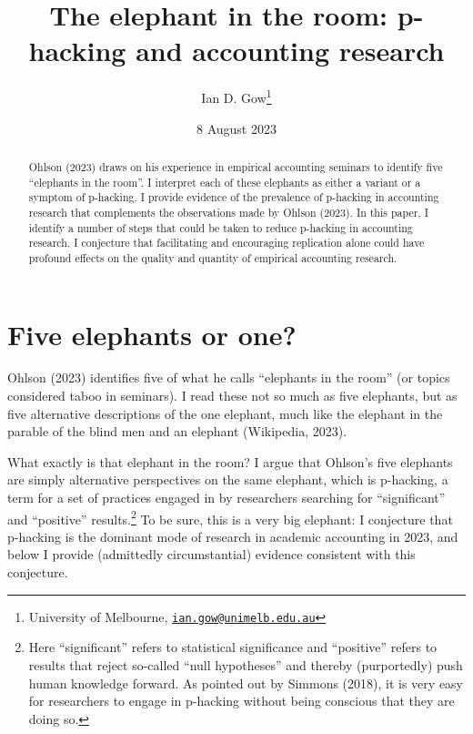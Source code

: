 \documentclass[
  letterpaper,
  DIV=11,
  numbers=noendperiod]{scrartcl}
\title{The elephant in the room: p-hacking and accounting research}
\author{Ian D. Gow\footnote{University of Melbourne,
  \href{mailto:ian.gow@unimelb.edu.au}{\nolinkurl{ian.gow@unimelb.edu.au}}}}
\date{8 August 2023}
\begin{document}
\maketitle
\begin{abstract}
Ohlson (2023) draws on his experience in empirical accounting seminars
to identify five ``elephants in the room''. I interpret each of these
elephants as either a variant or a symptom of p-hacking. I provide
evidence of the prevalence of p-hacking in accounting research that
complements the observations made by Ohlson (2023). In this paper, I
identify a number of steps that could be taken to reduce p-hacking in
accounting research. I conjecture that facilitating and encouraging
replication alone could have profound effects on the quality and
quantity of empirical accounting research.
\end{abstract}
\ifdefined\Shaded\renewenvironment{Shaded}{\begin{tcolorbox}[borderline west={3pt}{0pt}{shadecolor}, sharp corners, frame hidden, enhanced, breakable, interior hidden, boxrule=0pt]}{\end{tcolorbox}}\fi

\hypertarget{five-elephants-or-one}{%
\section{Five elephants or one?}\label{five-elephants-or-one}}

Ohlson (2023) identifies five of what he calls ``elephants in the room''
(or topics considered taboo in seminars). I read these not so much as
five elephants, but as five alternative descriptions of the one
elephant, much like the elephant in the parable of the blind men and an
elephant (Wikipedia, 2023).

What exactly is that elephant in the room? I argue that Ohlson's five
elephants are simply alternative perspectives on the same elephant,
which is p-hacking, a term for a set of practices engaged in by
researchers searching for ``significant'' and ``positive''
results.\footnote{Here ``significant'' refers to statistical
  significance and ``positive'' refers to results that reject so-called
  ``null hypotheses'' and thereby (purportedly) push human knowledge
  forward. As pointed out by Simmons (2018), it is very easy for
  researchers to engage in p-hacking without being conscious that they
  are doing so.} To be sure, this is a very big elephant: I conjecture
that p-hacking is the dominant mode of research in academic accounting
in 2023, and below I provide (admittedly circumstantial) evidence
consistent with this conjecture.
\end{document}
